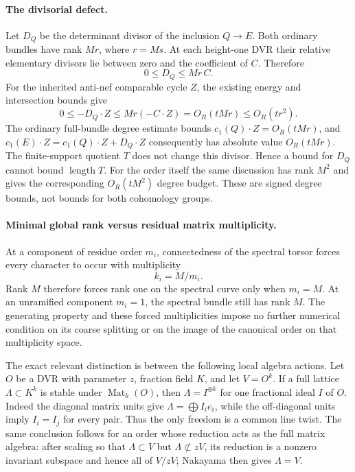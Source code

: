 \paragraph{The divisorial defect.}
Let $D_Q$ be the determinant divisor of the inclusion $Q\to E$.
Both ordinary bundles have rank $Mr$, where $r=Ms$.  At each
height-one DVR their relative elementary divisors lie between zero
and the coefficient of $C$.  Therefore
\[
                     0\le D_Q\le Mr\,C.
\]
For the inherited anti-nef comparable cycle $Z$, the existing energy
and intersection bounds give
\[
  0\le-D_Q\cdot Z\le Mr(-C\cdot Z)
                     =O_R(tMr)\le O_R(tr^2).
\]
The ordinary full-bundle degree estimate bounds
$c_1(Q)\cdot Z=O_R(tMr)$, and
$c_1(E)\cdot Z=c_1(Q)\cdot Z+D_Q\cdot Z$ consequently has absolute
value $O_R(tMr)$.  The finite-support quotient $T$ does not change
this divisor.  Hence a bound for $D_Q$ cannot bound $\operatorname{length}T$.
For the order itself the same discussion has rank $M^2$ and gives
the corresponding $O_R(tM^2)$ degree budget.  These are signed degree
bounds, not bounds for both cohomology groups.

\paragraph{Minimal global rank versus residual matrix multiplicity.}
At a component of residue order $m_i$, connectedness of the spectral
torsor forces every character to occur with multiplicity
\[
                              k_i=M/m_i.
\]
Rank $M$ therefore forces rank one on the spectral curve only when
$m_i=M$.  At an unramified component $m_i=1$, the spectral bundle
still has rank $M$.  The generating property and these forced
multiplicities impose no further numerical condition on its coarse
splitting or on the image of the canonical order on that
multiplicity space.

The exact relevant distinction is between the following local
algebra actions.  Let $O$ be a DVR with parameter $z$, fraction field
$K$, and let $V=O^k$.
If a full lattice $\Lambda\subset K^k$ is stable under
$\operatorname{Mat}_k(O)$, then $\Lambda=I^{\oplus k}$ for one
fractional ideal $I$ of $O$.  Indeed the diagonal matrix units give
$\Lambda=\bigoplus I_i e_i$, while the off-diagonal units imply
$I_i=I_j$ for every pair.  Thus the only freedom is a common line
twist.  The same conclusion follows for an order whose reduction
acts as the full matrix algebra: after scaling so that
$\Lambda\subset V$ but $\Lambda\not\subset zV$, its reduction is
a nonzero invariant subspace and hence all of $V/zV$; Nakayama
then gives $\Lambda=V$.

